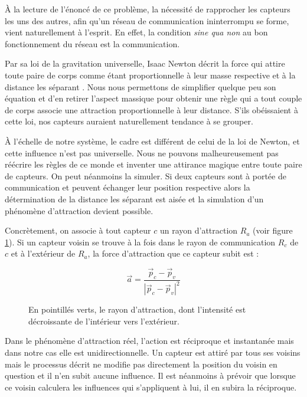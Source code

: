 \documentclass[10pt]{article}
\begin{document}
\begin{multicols}{2}
\`A la lecture de l'énoncé de ce problème, la nécessité de rapprocher
les capteurs les uns des autres, afin qu'un réseau de communication
ininterrompu se forme, vient naturellement à l'esprit. En effet, la
condition \textit{sine qua non} au bon fonctionnement du réseau est la
communication.

Par sa loi de la gravitation universelle, Isaac Newton décrit la force
qui attire toute paire de corps comme étant proportionnelle à leur
masse respective et à la distance les séparant \cite{newton}. Nous
nous permettons de simplifier quelque peu son équation et d'en retirer
l'aspect massique pour obtenir une règle qui a tout couple de corps
associe une attraction proportionnelle à leur distance. S'ils
obéissaient à cette loi, nos capteurs auraient naturellement tendance
à se grouper.

\`A l'échelle de notre système, le cadre est différent de celui de la
loi de Newton, et cette influence n'est pas universelle. Nous ne
pouvons malheureusement pas réécrire les règles de ce monde et
inventer une attirance magique entre toute paire de capteurs. On peut
néanmoins la simuler. Si deux capteurs sont à portée de communication
et peuvent échanger leur position respective alors la détermination de
la distance les séparant est aisée et la simulation d'un phénomène
d'attraction devient possible.

Concrètement, on associe à tout capteur $c$ un rayon d'attraction
$R_a$ (voir figure \ref{attraction}). Si un capteur voisin se trouve à
la fois dans le rayon de communication $R_c$ de $c$ et à l'extérieur
de $R_a$, la force d'attraction que ce capteur subit est :

$$
\vec{a} = \frac{\vec{p}_c - \vec{p}_v}{|\vec{p}_c - \vec{p}_v|^2}
$$

\begin{figure}[H]

  \centering

  

  \caption{En pointillés verts, le rayon d'attraction, dont
    l'intensité est décroissante de l'intérieur vers l'extérieur.}
  \label{attraction}

\end{figure}

Dans le phénomène d'attraction réel, l'action est réciproque et
instantanée mais dans notre cas elle est unidirectionnelle. Un capteur
est attiré par tous ses voisins mais le processus décrit ne modifie
pas directement la position du voisin en question et il n'en subit
aucune influence. Il est néanmoins à prévoir que lorsque ce voisin
calculera les influences qui s'appliquent à lui, il en subira la
réciproque.


\end{multicols}
\end{document}
